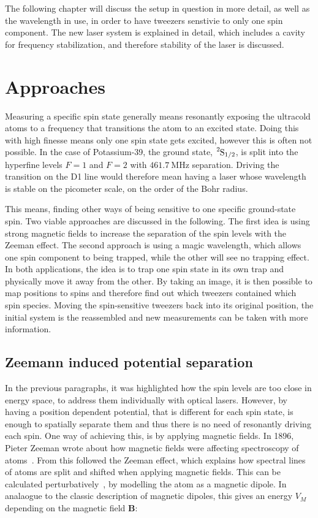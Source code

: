 The following chapter will discuss the setup in question in more detail, as well as the wavelength in use, in order to have tweezers senstivie to only one spin component. The new laser system is explained in detail, which includes a cavity for frequency stabilization, and therefore stability of the laser is discussed.

\section{Approaches}

Measuring a specific spin state generally means resonantly exposing the ultracold atoms to a frequency that transitions the atom to an excited state. Doing this with high finesse means only one spin state gets excited, however this is often not possible. In the case of Potassium-39, the ground state, $\ce{^2S_{1/2}}$, is split into the hyperfine levels $F=1$ and $F=2$ with $\SI{461.7}{\mega\hertz}$ separation. Driving the transition on the D1 line would therefore mean having a laser whose wavelength is stable on the picometer scale, on the order of the Bohr radius.

This means, finding other ways of being sensitive to one specific ground-state spin. Two viable approaches are discussed in the following. The first idea is using strong magnetic fields to increase the separation of the spin levels with the Zeeman effect. The second approach is using a magic wavelength, which allows one spin component to being trapped, while the other will see no trapping effect. In both applications, the idea is to trap one spin state in its own trap and physically move it away from the other. By taking an image, it is then possible to map positions to spins and therefore find out which tweezers contained which spin species. Moving the spin-sensitive tweezers back into its original position, the initial system is the reassembled and new measurements can be taken with more information.

\subsection{Zeemann induced potential separation}

In the previous paragraphs, it was highlighted how the spin levels are too close in energy space, to address them individually with optical lasers. However, by having a position dependent potential, that is different for each spin state, is enough to spatially separate them and thus there is no need of resonantly driving each spin. One way of achieving this, is by applying magnetic fields. In 1896, Pieter Zeeman wrote about how magnetic fields were affecting spectroscopy of atoms~\cite{Zeeman1896}. From this followed the Zeeman effect, which explains how spectral lines of atoms are split and shifted when applying magnetic fields. This can be calculated perturbatively~\cite{Griffiths2004}, by modelling the atom as a magnetic dipole. In analaogue to the classic description of magnetic dipoles, this gives an energy $V_M$ depending on the magnetic field $\bm{B}$:

